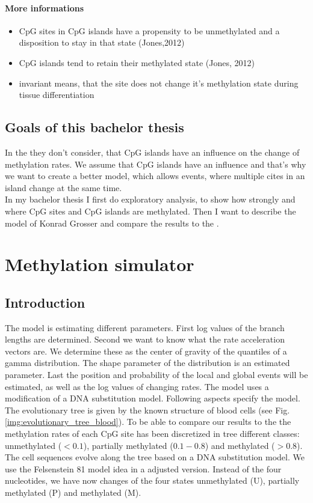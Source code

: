 \documentclass[12pt]{article} %
\begin{document}
	\paragraph{More informations}
	\begin{itemize}
		\item CpG sites in CpG islands have a propensity to be unmethylated and a disposition to stay in that state (Jones,2012)
		\item CpG islands tend to retain their methylated state (Jones, 2012)
		\item invariant means, that the site does not change it's methylation state during tissue differentiation
	\end{itemize}
	
	
	\subsection{Goals of this bachelor thesis}
	In the \cite{capra2014} they don't consider, that CpG islands have an influence on the change of methylation rates. We assume that CpG islands have an influence and that's why we want to create a better model, which allows events, where multiple cites in an island change at the same time.\\
	
	In my bachelor thesis I first do exploratory analysis, to show how strongly and where CpG sites and CpG islands are methylated.	Then I want to describe the model of Konrad Grosser and compare the results to the \cite{capra2014}.
		
	\section{Methylation simulator}
	\subsection{Introduction}
	The model is estimating different parameters. First log values of the branch lengths are determined. Second we want to know what the rate acceleration vectors are. We determine these as the center of gravity of the quantiles of a gamma distribution. The shape parameter of the distribution is an estimated parameter. 
	Last the position and probability of the local and global events will be estimated, as well as the log values of changing rates.
	The model uses a modification of a DNA substitution model. Following aspects specify the model. The evolutionary tree is given by the known structure of blood cells (see Fig. \ref{img:evolutionary_tree_blood}). To be able to compare our results to the \cite{capra2014} the methylation rates of each CpG site has been discretized in tree different classes: unmethylated ($<0.1$), partially methylated ($0.1-0.8$) and methylated ($>0.8$).\\
	The cell sequences evolve along the tree based on a DNA substitution model. We use the Felsenstein 81 model idea in a adjusted version. Instead of the four nucleotides, we have now changes of the four states unmethylated (U), partially methylated (P) and methylated (M).\\
	
\end{document}
